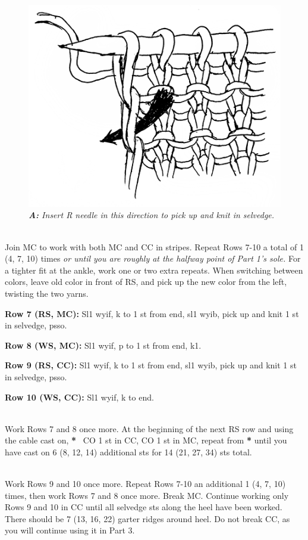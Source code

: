 \documentclass[12pt]{article}
\newcommand{\rowDir}[1]{\textbf{#1:}} %
\newcommand{\repmark}{\textbf{*}}
\newcommand{\longrepeat}[1]{\textbf{\repmark}~ #1, repeat from \repmark}%
\newcommand{\adjustment}[1]{\emph{#1}} %
\begin{document}
\begin{figure}
\includegraphics[width=\linewidth]{punk.png}
\emph{\small \textbf{A:} Insert R needle in this direction to pick up and knit in selvedge.}
\vspace{-1em}
\end{figure} \leavevmode

~\\
Join MC to work with both MC and CC in stripes. Repeat Rows 7-10 a total of 1 (4, 7, 10) times \adjustment{or until you are roughly at the halfway point of Part 1’s sole.} For a tighter fit at the ankle, work one or two extra repeats. When switching between colors, leave old color in front of RS, and pick up the new color from the left, twisting the two yarns.

\rowDir{Row 7 (RS, MC)} Sl1 wyif, k to 1 st from end, sl1 wyib, pick up and knit 1 st in selvedge, psso.

\rowDir{Row 8 (WS, MC)} Sl1 wyif, p to 1 st from end, k1.

\rowDir{Row 9 (RS, CC)} Sl1 wyif, k to 1 st from end, sl1 wyib, pick up and knit 1 st in selvedge, psso.

\rowDir{Row 10 (WS, CC)} Sl1 wyif, k to end.

~\\
Work Rows 7 and 8 once more. At the beginning of the next RS row and using the cable cast on, \longrepeat{CO 1 st in CC, CO 1 st in MC} until you have cast on 6 (8, 12, 14) additional sts for 14 (21, 27, 34) sts total.

~\\
Work Rows 9 and 10 once more. Repeat Rows 7-10 an additional 1 (4, 7, 10) times, then work Rows 7 and 8 once more. Break MC. Continue working only Rows 9 and 10 in CC until all selvedge sts along the heel have been worked. There should be 7 (13, 16, 22) garter ridges around heel. Do not break CC, as you will continue using it in Part 3.
\end{document}
